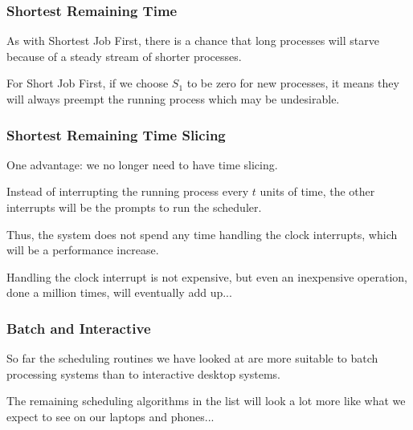 \begin{frame}
\frametitle{Shortest Remaining Time}

As with Shortest Job First, there is a chance that long processes will starve because of a steady stream of shorter processes. 

For Short Job First, if we choose $S_{1}$ to be zero for new processes, it means they will always preempt the running process which may be undesirable.


\end{frame}

\begin{frame}
\frametitle{Shortest Remaining Time Slicing}

One advantage: we no longer need to have time slicing. 

Instead of interrupting the running process every $t$ units of time, the other interrupts will be the prompts to run the scheduler. 

Thus, the system does not spend any time handling the clock interrupts, which will be a performance increase. 

Handling the clock interrupt is not expensive, but even an inexpensive operation, done a million times, will eventually add up...


\end{frame}



\begin{frame}
\frametitle{Batch and Interactive}

So far the scheduling routines we have looked at are more suitable to batch processing systems than to interactive desktop systems. 

The remaining scheduling algorithms in the list will look a lot more like what we expect to see on our laptops and phones...


\end{frame}



